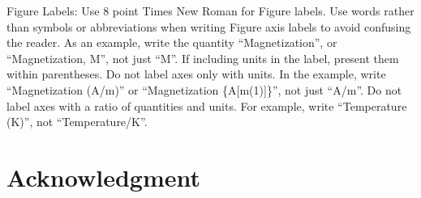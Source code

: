 \documentclass[conference]{IEEEtran}
\begin{document}
Figure Labels: Use 8 point Times New Roman for Figure labels. Use words 
rather than symbols or abbreviations when writing Figure axis labels to 
avoid confusing the reader. As an example, write the quantity 
``Magnetization'', or ``Magnetization, M'', not just ``M''. If including 
units in the label, present them within parentheses. Do not label axes only 
with units. In the example, write ``Magnetization (A/m)'' or ``Magnetization 
\{A[m(1)]\}'', not just ``A/m''. Do not label axes with a ratio of 
quantities and units. For example, write ``Temperature (K)'', not 
``Temperature/K''.

\section*{Acknowledgment}



\end{document}
